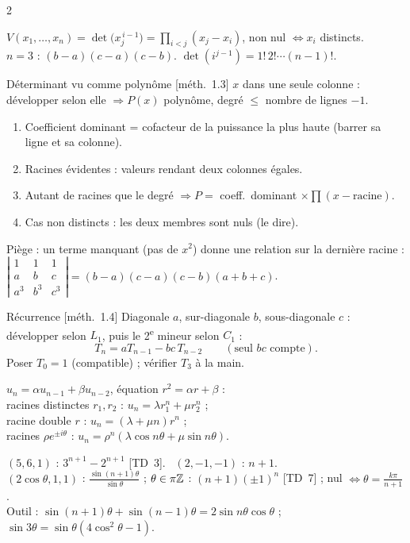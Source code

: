 \documentclass[a4paper,10pt]{article}
\newcommand{\dt}[1]{\left|\begin{matrix}#1\end{matrix}\right|}
\newcommand{\livre}[1]{{\sffamily\scriptsize\color{Gris}[#1]}}
\newcommand{\sous}[1]{\par\needspace{6\baselineskip}\vspace{0.25em}\noindent{\sffamily\bfseries\small\color{BleuMoyen}#1}\par\nobreak}
\begin{document}
\begin{multicols}{2}
\sous{Vandermonde}
\begin{FORM}[\livre{th.~1.14}]
$V(x_1,\dots,x_n)=\det\big(x_j^{\,i-1}\big)=\prod_{i<j}(x_j-x_i)$, non nul $\iff x_i$ distincts.\\
$n=3$ : $(b-a)(c-a)(c-b)$. $\det(i^{j-1})=1!\,2!\cdots(n-1)!$.
\end{FORM}
\begin{METH}{Déterminant vu comme polynôme \livre{méth.~1.3}}
$x$ dans une seule colonne : développer selon elle $\Rightarrow P(x)$ polynôme, degré $\leq$ nombre de lignes $-1$.
\begin{enumerate}
\item Coefficient dominant = cofacteur de la puissance la plus haute (barrer sa ligne et sa colonne).
\item Racines évidentes : valeurs rendant deux colonnes égales.
\item Autant de racines que le degré $\Rightarrow P=$ coeff.\ dominant $\times\prod(x-\text{racine})$.
\item Cas non distincts : les deux membres sont nuls (le dire).
\end{enumerate}
Piège : un terme manquant (pas de $x^2$) donne une relation sur la dernière racine : $\dt{1&1&1\\a&b&c\\a^3&b^3&c^3}=(b-a)(c-a)(c-b)(a+b+c)$.
\end{METH}

\sous{Tridiagonaux}
\begin{METH}{Récurrence \livre{méth.~1.4}}
Diagonale $a$, sur-diagonale $b$, sous-diagonale $c$ : développer selon $L_1$, puis le 2\textsuperscript{e} mineur selon $C_1$ :
\[T_n=aT_{n-1}-bc\,T_{n-2}\qquad(\text{seul }bc\text{ compte}).\]
Poser $T_0=1$ (compatible) ; vérifier $T_3$ à la main.
\end{METH}
\begin{FORM}
$u_n=\alpha u_{n-1}+\beta u_{n-2}$, équation $r^2=\alpha r+\beta$ :\\
racines distinctes $r_1,r_2$ : $u_n=\lambda r_1^n+\mu r_2^n$ ;\\
racine double $r$ : $u_n=(\lambda+\mu n)r^n$ ;\\
racines $\rho e^{\pm i\theta}$ : $u_n=\rho^n(\lambda\cos n\theta+\mu\sin n\theta)$.
\end{FORM}
\begin{FORM}[RÉSULTATS]
$(5,6,1)$ : $3^{n+1}-2^{n+1}$ \livre{TD~3}. \ $(2,-1,-1)$ : $n+1$.\\
$(2\cos\theta,1,1)$ : $\frac{\sin(n+1)\theta}{\sin\theta}$ ; $\theta\in\pi\mathbb{Z}$ : $(n+1)(\pm1)^n$ \livre{TD~7} ; nul $\iff\theta=\frac{k\pi}{n+1}$.\\
Outil : $\sin(n+1)\theta+\sin(n-1)\theta=2\sin n\theta\cos\theta$ ; $\sin3\theta=\sin\theta(4\cos^2\theta-1)$.
\end{FORM}


\end{multicols}
\end{document}
